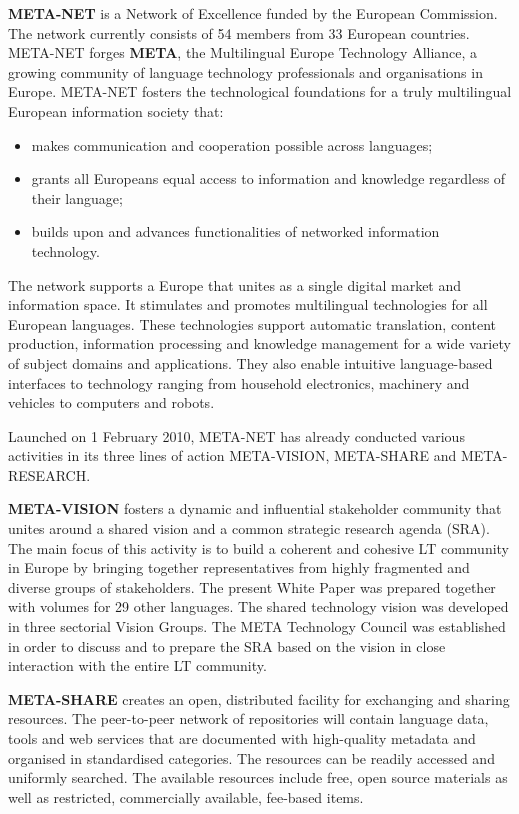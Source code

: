 \documentclass[]{../metanetpaper}
\begin{document}
\begin{multicols}{2}

\textbf{META-NET} is a Network of Excellence funded by the European Commission. The network currently consists of 54 members from 33 European countries. 
META-NET forges \textbf{META}, the Multilingual Europe Technology Alliance, a growing community of language technology professionals and organisations in Europe.
META-NET fosters the technological foundations for a truly multilingual European information society that:

\begin{itemize}
\item makes communication and cooperation possible across languages;
\item grants all Europeans equal access to information and knowledge regardless of their language;
\item builds upon and advances functionalities of networked information technology.
\end{itemize}

The network supports a Europe that unites as a single digital market and information space. It stimulates and promotes multilingual technologies for all European languages. These technologies support automatic translation, content production, information processing and knowledge management for a wide variety of subject domains and applications. They also enable intuitive language-based interfaces to technology ranging from household electronics, machinery and vehicles to computers and robots.

Launched on 1 February 2010, META-NET has already conducted various activities in its three lines of action META-VISION, META-SHARE and META-RESEARCH. 

\textbf{META-VISION} fosters a dynamic and influential stakeholder community that unites around a shared vision and a common strategic research agenda (SRA). The main focus of this activity is to build a coherent and cohesive LT community in Europe by bringing together representatives from highly fragmented and diverse groups of stakeholders. The present White Paper was prepared together with volumes for 29 other languages. The shared technology vision was developed in three sectorial Vision Groups. The META Technology Council was established in order to discuss and to prepare the SRA based on the vision in close interaction with the entire LT community.

\textbf{META-SHARE} creates an open, distributed facility for exchanging and sharing resources. The peer-to-peer network of repositories will contain language data, tools and web services that are documented with high-quality metadata and organised in standardised categories. The resources can be readily accessed and uniformly searched. The available resources include free, open source materials as well as restricted, commercially available, fee-based items. 


\end{multicols}
\end{document}
